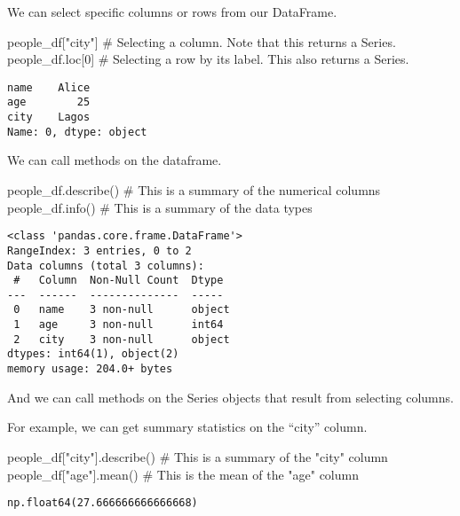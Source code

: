 \documentclass[
  letterpaper,
  DIV=11,
  numbers=noendperiod]{scrreprt}
\newenvironment{Shaded}{\begin{snugshade}}{\end{snugshade}}
\newcommand{\CommentTok}[1]{\textcolor[rgb]{0.37,0.37,0.37}{#1}}
\newcommand{\DecValTok}[1]{\textcolor[rgb]{0.68,0.00,0.00}{#1}}
\newcommand{\NormalTok}[1]{\textcolor[rgb]{0.00,0.23,0.31}{#1}}
\newcommand{\StringTok}[1]{\textcolor[rgb]{0.13,0.47,0.30}{#1}}
\begin{document}
We can select specific columns or rows from our DataFrame.

\begin{Shaded}
\begin{Highlighting}[]
\NormalTok{people\_df[}\StringTok{"city"}\NormalTok{]  }\CommentTok{\# Selecting a column. Note that this returns a Series.}
\NormalTok{people\_df.loc[}\DecValTok{0}\NormalTok{]  }\CommentTok{\# Selecting a row by its label. This also returns a Series.}
\end{Highlighting}
\end{Shaded}

\begin{verbatim}
name    Alice
age        25
city    Lagos
Name: 0, dtype: object
\end{verbatim}

We can call methods on the dataframe.

\begin{Shaded}
\begin{Highlighting}[]
\NormalTok{people\_df.describe() }\CommentTok{\# This is a summary of the numerical columns}
\NormalTok{people\_df.info() }\CommentTok{\# This is a summary of the data types}
\end{Highlighting}
\end{Shaded}

\begin{verbatim}
<class 'pandas.core.frame.DataFrame'>
RangeIndex: 3 entries, 0 to 2
Data columns (total 3 columns):
 #   Column  Non-Null Count  Dtype 
---  ------  --------------  ----- 
 0   name    3 non-null      object
 1   age     3 non-null      int64 
 2   city    3 non-null      object
dtypes: int64(1), object(2)
memory usage: 204.0+ bytes
\end{verbatim}

And we can call methods on the Series objects that result from selecting
columns.

For example, we can get summary statistics on the ``city'' column.

\begin{Shaded}
\begin{Highlighting}[]
\NormalTok{people\_df[}\StringTok{"city"}\NormalTok{].describe()  }\CommentTok{\# This is a summary of the "city" column}
\NormalTok{people\_df[}\StringTok{"age"}\NormalTok{].mean()  }\CommentTok{\# This is the mean of the "age" column}
\end{Highlighting}
\end{Shaded}

\begin{verbatim}
np.float64(27.666666666666668)
\end{verbatim}
\end{document}
